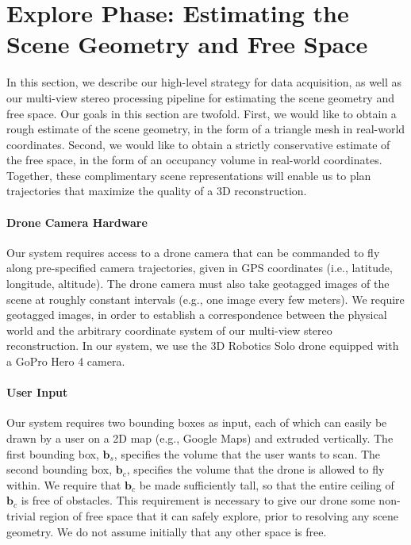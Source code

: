 \section{Explore Phase: Estimating the Scene Geometry and Free Space}
\label{sec:free_space}

In this section, we describe our high-level strategy for data acquisition, as well as our multi-view stereo processing pipeline for estimating the scene geometry and free space.
Our goals in this section are twofold.
First, we would like to obtain a rough estimate of the scene geometry, in the form of a triangle mesh in real-world coordinates.
Second, we would like to obtain a strictly conservative estimate of the free space, in the form of an occupancy volume in real-world coordinates.
Together, these complimentary scene representations will enable us to plan trajectories that maximize the quality of a 3D reconstruction.

\vspace{-12pt}
\paragraph{Drone Camera Hardware}
Our system requires access to a drone camera that can be commanded to fly along pre-specified camera trajectories, given in GPS coordinates (i.e., latitude, longitude, altitude).
The drone camera must also take geotagged images of the scene at roughly constant intervals (e.g., one image every few meters).
We require geotagged images, in order to establish a correspondence between the physical world and the arbitrary coordinate system of our multi-view stereo reconstruction.
In our system, we use the 3D Robotics Solo drone \cite{3dr:2017b} equipped with a GoPro Hero 4 camera.

\vspace{-12pt}
\paragraph{User Input}
Our system requires two bounding boxes as input, each of which can easily be drawn by a user on a 2D map (e.g., Google Maps) and extruded vertically.
The first bounding box, $\mathbf{b}_s$, specifies the volume that the user wants to scan.
The second bounding box, $\mathbf{b}_c$, specifies the volume that the drone is allowed to fly within.
We require that $\mathbf{b}_c$ be made sufficiently tall, so that the entire ceiling of $\mathbf{b}_c$ is free of obstacles.
This requirement is necessary to give our drone some non-trivial region of free space that it can safely explore, prior to resolving any scene geometry.
We do not assume initially that any other space is free.


